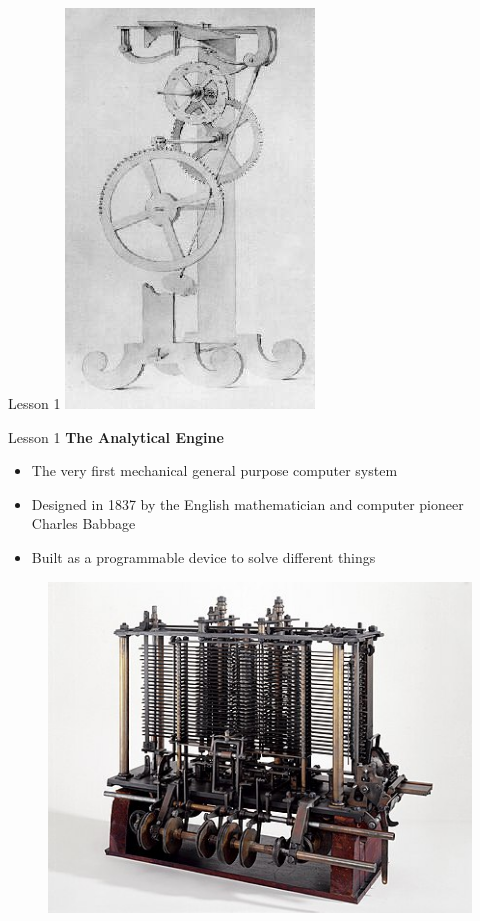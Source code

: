 \documentclass[aspectratio=1610]{beamer}
\begin{document}
\begin{frame}{Lesson 1}{}
\includegraphics[scale=0.35]{Images/Galileo_Pendulum_Clock}
\end{frame}


\begin{frame}{Lesson 1}{}
{\Large\textbf{{The Analytical Engine}}}
\Large
\begin{minipage}{0.64\textwidth}
    \begin{itemize}
      \item The very first mechanical general purpose computer system
      \item Designed in 1837 by the English mathematician and computer pioneer Charles Babbage
      \item Built as a programmable device to solve different things  
    \end{itemize}
  \end{minipage}
\begin{minipage}{0.25\textwidth}
      \begin{figure}
        \includegraphics[scale=0.45]{Images/Babbages_AnalyticalEngine}
      \end{figure}
  \end{minipage}  
\end{frame}
\end{document}
